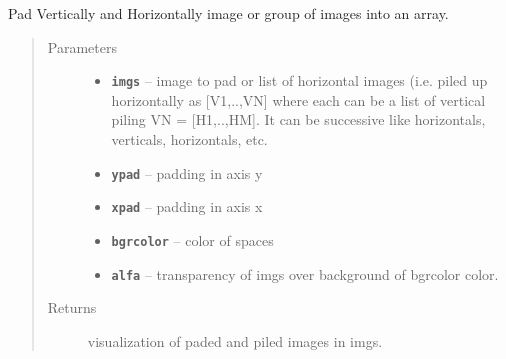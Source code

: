 \documentclass[letterpaper,10pt,english]{sphinxmanual}
\begin{document}
\begin{fulllineitems}
\label{RRtoolbox.lib.arrayops:RRtoolbox.lib.arrayops.basic.padVH}
Pad Vertically and Horizontally image or group of images into an array.
\begin{quote}\begin{description}
\item[{Parameters}] \leavevmode\begin{itemize}
\item {} 
\textbf{\texttt{imgs}} -- image to pad or list of horizontal images (i.e. piled
up horizontally as {[}V1,..,VN{]} where each can be a list
of vertical piling VN = {[}H1,..,HM{]}. It can be successive
like horizontals, verticals, horizontals, etc.

\item {} 
\textbf{\texttt{ypad}} -- padding in axis y

\item {} 
\textbf{\texttt{xpad}} -- padding in axis x

\item {} 
\textbf{\texttt{bgrcolor}} -- color of spaces

\item {} 
\textbf{\texttt{alfa}} -- transparency of imgs over background of bgrcolor color.

\end{itemize}

\item[{Returns}] \leavevmode
visualization of paded and piled images in imgs.

\end{description}\end{quote}

\end{fulllineitems}

\end{document}
